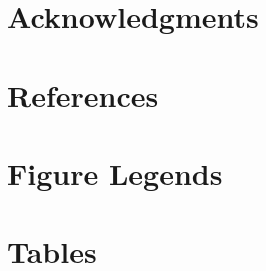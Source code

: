 \documentclass[10pt]{article}
\begin{document}
\section*{Acknowledgments}


\section*{References}


\section*{Figure Legends}


\section*{Tables}
\end{document}
